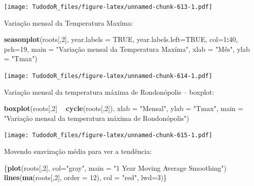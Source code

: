 \documentclass[
]{book}
\newenvironment{Shaded}{\begin{snugshade}}{\end{snugshade}}
\newcommand{\DataTypeTok}[1]{\textcolor[rgb]{0.13,0.29,0.53}{#1}}
\newcommand{\DecValTok}[1]{\textcolor[rgb]{0.00,0.00,0.81}{#1}}
\newcommand{\KeywordTok}[1]{\textcolor[rgb]{0.13,0.29,0.53}{\textbf{#1}}}
\newcommand{\NormalTok}[1]{#1}
\newcommand{\OperatorTok}[1]{\textcolor[rgb]{0.81,0.36,0.00}{\textbf{#1}}}
\newcommand{\OtherTok}[1]{\textcolor[rgb]{0.56,0.35,0.01}{#1}}
\newcommand{\StringTok}[1]{\textcolor[rgb]{0.31,0.60,0.02}{#1}}
\begin{document}
\texttt{[image: TudodoR\_files/figure-latex/unnamed-chunk-613-1.pdf]}

Variação mensal da Temperatura Maxíma:

\begin{Shaded}
\begin{Highlighting}[]
\KeywordTok{seasonplot}\NormalTok{(roots[,}\DecValTok{2}\NormalTok{], }\DataTypeTok{year.labels =} \OtherTok{TRUE}\NormalTok{, }\DataTypeTok{year.labels.left=}\OtherTok{TRUE}\NormalTok{, }\DataTypeTok{col=}\DecValTok{1}\OperatorTok{:}\DecValTok{40}\NormalTok{, }\DataTypeTok{pch=}\DecValTok{19}\NormalTok{, }\DataTypeTok{main =} \StringTok{"Variação mensal da Temperatura Maxíma"}\NormalTok{, }\DataTypeTok{xlab =} \StringTok{"Mês", ylab = "}\NormalTok{Tmax}\StringTok{")}
\end{Highlighting}
\end{Shaded}

\texttt{[image: TudodoR\_files/figure-latex/unnamed-chunk-614-1.pdf]}

Variação mensal da temperatura máxima de Rondonópolis -- boxplot:

\begin{Shaded}
\begin{Highlighting}[]
\KeywordTok{boxplot}\NormalTok{(roots[,}\DecValTok{2}\NormalTok{] }\OperatorTok{~}\StringTok{ }\KeywordTok{cycle}\NormalTok{(roots[,}\DecValTok{2}\NormalTok{]), }\DataTypeTok{xlab =} \StringTok{"Mensal"}\NormalTok{, }\DataTypeTok{ylab =} \StringTok{"Tmax"}\NormalTok{, }\DataTypeTok{main =} \StringTok{"Variação mensal da temperatura máxima de Rondonópolis")}
\end{Highlighting}
\end{Shaded}

\texttt{[image: TudodoR\_files/figure-latex/unnamed-chunk-615-1.pdf]}

Movendo suavização média para ver a tendência:

\begin{Shaded}
\begin{Highlighting}[]
\NormalTok{\{}\KeywordTok{plot}\NormalTok{(roots[,}\DecValTok{2}\NormalTok{], }\DataTypeTok{col=}\StringTok{"gray"}\NormalTok{, }\DataTypeTok{main =} \StringTok{"1 Year Moving Average Smoothing"}\NormalTok{)}
\KeywordTok{lines}\NormalTok{(}\KeywordTok{ma}\NormalTok{(roots[,}\DecValTok{2}\NormalTok{], }\DataTypeTok{order =} \DecValTok{12}\NormalTok{), }\DataTypeTok{col =} \StringTok{"red"}\NormalTok{, }\DataTypeTok{lwd=}\DecValTok{3}\NormalTok{)\}}
\end{Highlighting}
\end{Shaded}
\end{document}
